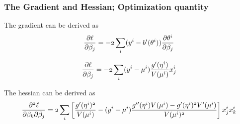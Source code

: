\documentclass[notheorems, aspectratio=54]{beamer}
\begin{document}
\begin{frame}
\frametitle{The Gradient and Hessian; Optimization quantity}
The gradient can be derived as
$$\mathnormal{\frac{\partial \ell}{\partial \beta_j}}=\mathnormal{-2\sum_i(y^i-b'(\theta^i))\frac{\partial\theta^i}{\partial\beta_j}}$$

$$\mathnormal{\frac{\partial \ell}{\partial \beta_j}}=\mathnormal{-2\sum_i(y^i-\mu^i)\frac{g'(\eta^i)}{V(\mu^i)}x_j^i}$$

The hessian can be derived as
$$\mathnormal{\frac{\partial^2 \ell}{\partial \beta_k\partial \beta_j}=2\sum_i\left[\frac{g'(\eta^i)^2}{V(\mu^i)}-(y^i-\mu^i)\frac{g''(\eta^i)V(\mu^i)-g'(\eta^i)^2V'(\mu^i)}{V(\mu^i)^2}\right]x_j^ix_k^i}$$
\end{frame}
\end{document}
